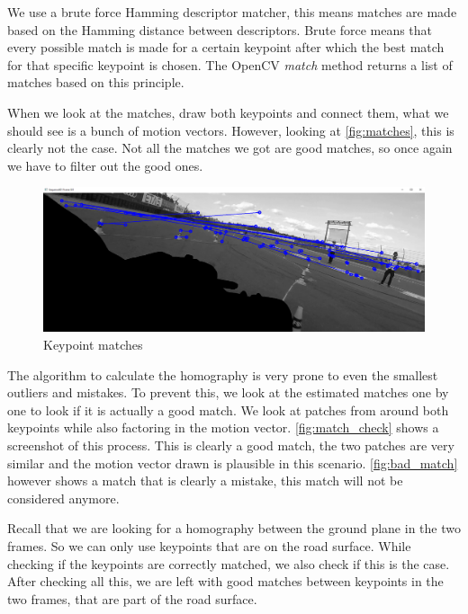 We use a brute force Hamming descriptor matcher, this means matches are made based on the Hamming distance between descriptors. Brute force means that every possible match is made for a certain keypoint after which the best match for that specific keypoint is chosen. The OpenCV \textit{match} method returns a list of matches based on this principle.\bigskip

When we look at the matches, draw both keypoints and connect them, what we should see is a bunch of motion vectors. However, looking at \autoref{fig:matches}, this is clearly not the case. Not all the matches we got are good matches, so once again we have to filter out the good ones.\bigskip

\begin{figure}
    \centering
    \includegraphics[width=1\textwidth]{figures/keypoint_matches.png}
    \caption{Keypoint matches}
    \label{fig:matches}
\end{figure}

The algorithm to calculate the homography is very prone to even the smallest outliers and mistakes. To prevent this, we look at the estimated matches one by one to look if it is actually a good match. We look at patches from around both keypoints while also factoring in the motion vector. \autoref{fig:match_check} shows a screenshot of this process. This is clearly a good match, the two patches are very similar and the motion vector drawn is plausible in this scenario. \autoref{fig:bad_match} however shows a match that is clearly a mistake, this match will not be considered anymore.\bigskip

Recall that we are looking for a homography between the ground plane in the two frames. So we can only use keypoints that are on the road surface. While checking if the keypoints are correctly matched, we also check if this is the case. After checking all this, we are left with good matches between keypoints in the two frames, that are part of the road surface.

